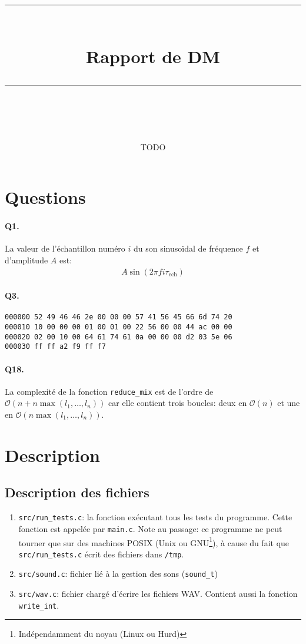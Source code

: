 \documentclass[11pt]{article} %
\title{
    \vspace{10pt} %
    \rule{\linewidth}{1pt}\\ %
    \vspace{10pt} %
    {\huge Rapport de DM}\\ %
    \rule{\linewidth}{1pt}\\ %
    \vspace{5pt} %
}
\date{\printdate{2024-12-29}}
\author{TODO}
\newcommand{\nbsp}{\nobreakspace}
\begin{document}
\maketitle{}

\section{Questions}
\paragraph{Q1.}
La valeur de l’échantillon numéro $i$ du son sinusoïdal de fréquence $f$ et
d’amplitude $A$ est\nbsp:
\begin{align*}
A \sin(2\pi f i \tau_\text{ech})
\end{align*}

\paragraph{Q3.}
\nbsp

\begin{lstlisting}
000000 52 49 46 46 2e 00 00 00 57 41 56 45 66 6d 74 20
000010 10 00 00 00 01 00 01 00 22 56 00 00 44 ac 00 00
000020 02 00 10 00 64 61 74 61 0a 00 00 00 d2 03 5e 06
000030 ff ff a2 f9 ff f7
\end{lstlisting}

\paragraph{Q18.}
La complexité de la fonction \verb|reduce_mix| est de l’ordre de
$\mathcal O(n+n\max(l_1, \dots, l_n))$ car elle contient trois boucles\nbsp:
deux en $\mathcal O(n)$ et une en $\mathcal O(n\max(l_1, \dots, l_n))$.

\section{Description}

\subsection{Description des fichiers}
\begin{enumerate}
    \item \verb|src/run_tests.c|\nbsp: la fonction exécutant tous les tests
        du programme. Cette fonction est appelée par \verb|main.c|.
        Note au passage\nbsp: ce programme ne peut tourner que sur des machines
        POSIX (Unix ou GNU\footnote{Indépendamment du noyau (Linux ou Hurd)}),
        à cause du fait que \verb|src/run_tests.c| écrit des fichiers dans
        \verb|/tmp|.
    \item \verb|src/sound.c|\nbsp: fichier lié à la gestion des sons
        (\verb|sound_t|)
    \item \verb|src/wav.c|\nbsp: fichier chargé d’écrire les fichiers WAV.
        Contient aussi la fonction \verb|write_int|.
\end{enumerate}
\end{document}
